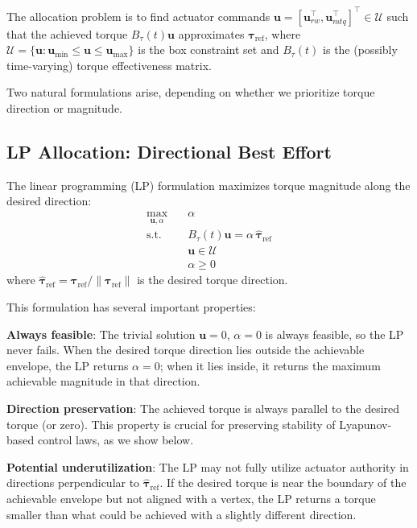 \documentclass[conference]{IEEEtran}
\begin{document}
The allocation problem is to find actuator commands $\mathbf{u} = [\mathbf{u}_{rw}^\top, \mathbf{u}_{mtq}^\top]^\top \in \mathcal{U}$ such that the achieved torque $B_\tau(t) \mathbf{u}$ approximates $\boldsymbol{\tau}_{\text{ref}}$, where $\mathcal{U} = \{\mathbf{u} : \mathbf{u}_{\min} \leq \mathbf{u} \leq \mathbf{u}_{\max}\}$ is the box constraint set and $B_\tau(t)$ is the (possibly time-varying) torque effectiveness matrix.

Two natural formulations arise, depending on whether we prioritize torque direction or magnitude.

\subsection{LP Allocation: Directional Best Effort}
The linear programming (LP) formulation maximizes torque magnitude along the desired direction:
\begin{equation}
\begin{aligned}
\max_{\mathbf{u}, \alpha} \quad & \alpha \\
\text{s.t.} \quad & B_\tau(t) \mathbf{u} = \alpha \, \hat{\boldsymbol{\tau}}_{\text{ref}} \\
& \mathbf{u} \in \mathcal{U} \\
& \alpha \geq 0
\end{aligned}
\label{eq:lp_allocation}
\end{equation}
where $\hat{\boldsymbol{\tau}}_{\text{ref}} = \boldsymbol{\tau}_{\text{ref}} / \|\boldsymbol{\tau}_{\text{ref}}\|$ is the desired torque direction.

This formulation has several important properties:

\textbf{Always feasible}: The trivial solution $\mathbf{u} = 0$, $\alpha = 0$ is always feasible, so the LP never fails. When the desired torque direction lies outside the achievable envelope, the LP returns $\alpha = 0$; when it lies inside, it returns the maximum achievable magnitude in that direction.

\textbf{Direction preservation}: The achieved torque is always parallel to the desired torque (or zero). This property is crucial for preserving stability of Lyapunov-based control laws, as we show below.

\textbf{Potential underutilization}: The LP may not fully utilize actuator authority in directions perpendicular to $\hat{\boldsymbol{\tau}}_{\text{ref}}$. If the desired torque is near the boundary of the achievable envelope but not aligned with a vertex, the LP returns a torque smaller than what could be achieved with a slightly different direction.
\end{document}
